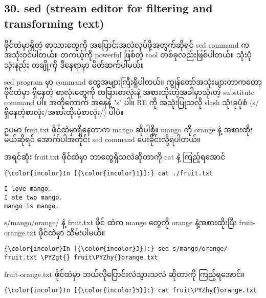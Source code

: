 \documentclass[11pt]{article}
\def\PYZgt{\char`\>}
\def\PYZhy{\char`\-}
\begin{document}
    \subsection{30. sed (stream editor for filtering and transforming
text)}\label{sed-stream-editor-for-filtering-and-transforming-text}

ဖိုင်ထဲမှာရှိတဲ့ စာသားတွေကို အပြောင်းအလဲလုပ်ဖို့အတွက်ဆိုရင် sed command
က အသုံးဝင်ပါတယ်။ တကယ့်ကို powerful ဖြစ်တဲ့ tool တစ်ခုလည်းဖြစ်ပါတယ်။
သုံးပုံသုံးနည်း တချို့ကို ဒီနေရာမှာ မိတ်ဆက်ပါမယ်။

sed program မှာ command တွေအများကြီးရှိပါတယ်။ ကျွန်တော်အသုံးများတာကတော့
ဖိုင်ထဲမှာ ရှိနေတဲ့ စာလုံးတွေကို တခြားစာလုံးနဲ့ အစားထိုးတဲ့အခါမှာသုံးတဲ့
substitute command ပါ။ အတိုကောက် အနေနဲ့ "s" ပါ။ RE ကို အသုံးပြုသလို
slash သုံးခုပုံစံ (s/ရှိနေတဲ့စာလုံး/အစားထိုးမဲ့စာလုံး/) ပါပဲ။

ဥပမာ fruit.txt ဖိုင်ထဲမှာရှိနေတာက mango ဆိုပါစို့။ mango ကို orange နဲ့
အစားထိုးမယ်ဆိုရင် အောက်ပါအတိုင်း sed command ပေးခိုင်းလို့ရပါတယ်။

အရင်ဆုံး fruit.txt ဖိုင်ထဲမှာ ဘာတွေရှိသလဲဆိုတာကို cat နဲ့ ကြည့်ရအောင်

    \begin{Verbatim}[commandchars=\\\{\}]
{\color{incolor}In [{\color{incolor}1}]:} cat ./fruit.txt
\end{Verbatim}

    \begin{Verbatim}[commandchars=\\\{\}]
I love mango.
I ate two mango.
mango is mango.

    \end{Verbatim}

    s/mango/orange/ နဲ့ fruit.txt ဖိုင် ထဲက mango တွေကို orange
နဲ့အစားထိုးပြီး fruit-orange.txt ဖိုင်ထဲမှာ သိမ်းပါမယ်။

    \begin{Verbatim}[commandchars=\\\{\}]
{\color{incolor}In [{\color{incolor}3}]:} sed s/mango/orange/ fruit.txt \PYZgt{} fruit\PYZhy{}orange.txt
\end{Verbatim}

    fruit-orange.txt ဖိုင်ထဲမှာ ဘယ်လိုပြောင်းလဲသွားသလဲ ဆိုတာကို ကြည့်ရအောင်။

    \begin{Verbatim}[commandchars=\\\{\}]
{\color{incolor}In [{\color{incolor}5}]:} cat fruit\PYZhy{}orange.txt
\end{Verbatim}
\end{document}
